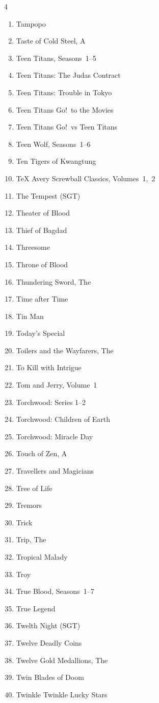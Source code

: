 \documentclass{article}
\begin{document}
\begin{multicols}{4}
\begin{enumerate}
\item Tampopo
\item Taste of Cold Steel, A
\item Teen Titans, Seasons~1--5
\item Teen Titans: The Judas Contract
\item Teen Titans: Trouble in Tokyo
\item Teen Titans Go!\ to the Movies
\item Teen Titans Go!\ vs Teen Titans
\item Teen Wolf, Seasons~1--6
\item Ten Tigers of Kwangtung
\item TeX Avery Screwball Classics, Volumes~1,~2
\item The Tempest (SGT)
\item Theater of Blood
\item Thief of Bagdad
\item Threesome
\item Throne of Blood
\item Thundering Sword, The
\item Time after Time
\item Tin Man
\item Today's Special
\item Toilers and the Wayfarers, The
\item To Kill with Intrigue
\item Tom and Jerry, Volume~1
\item Torchwood: Series 1--2
\item Torchwood: Children of Earth
\item Torchwood: Miracle Day
\item Touch of Zen, A
\item Travellers and Magicians
\item Tree of Life
\item Tremors
\item Trick
\item Trip, The
\item Tropical Malady
\item Troy
\item True Blood, Seasons~1--7
\item True Legend
\item Twelth Night (SGT)
\item Twelve Deadly Coins
\item Twelve Gold Medallions, The
\item Twin Blades of Doom
\item Twinkle Twinkle Lucky Stars

\end{enumerate}
\end{multicols}
\end{document}
